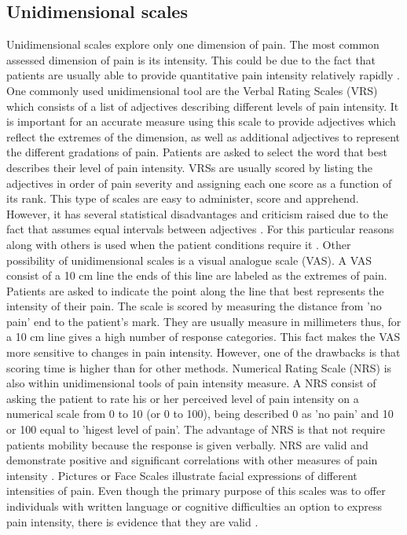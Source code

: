  \subsection{Unidimensional scales}
Unidimensional scales explore only one dimension of pain. The most common assessed dimension of pain is its intensity. This could be due to the fact that patients are usually able to provide quantitative pain intensity relatively rapidly \cite{libro pain}. One commonly used unidimensional tool are the Verbal Rating Scales (VRS) which consists of a list of adjectives describing different levels of pain intensity. It is important for an accurate measure using this scale to provide adjectives which reflect the extremes of the dimension, as well as additional adjectives to represent the different gradations of pain. Patients are asked to select the word that best describes their level of pain intensity. VRSs are usually scored by listing the adjectives in order of pain severity and assigning each one score as a function of its rank. This type of scales are easy to administer, score and apprehend. However, it has several statistical disadvantages and criticism raised due to the fact that assumes equal intervals between adjectives \cite{libro pain}. For this particular reasons along with others is used when the patient conditions require it \cite{six methods paper}. Other possibility of unidimensional scales is a visual analogue scale (VAS). A VAS consist of a 10 cm line the ends of this line are labeled as the extremes of pain. Patients are asked to indicate the point along the line that best represents the intensity of their pain. The scale is scored by measuring the distance from 'no pain' end to the patient's mark. They are usually measure in millimeters thus, for a 10 cm line gives a high number of response categories. This fact makes the VAS more sensitive to changes in pain intensity. However, one of the drawbacks is that scoring time is higher than for other methods. Numerical Rating Scale (NRS) is also within unidimensional tools of pain intensity measure. A NRS consist of asking the patient to rate his or her perceived level of pain intensity on a numerical scale from 0 to 10 (or 0 to 100), being described 0 as 'no pain' and  10 or 100 equal to 'higest level of pain'. The advantage of  NRS is that not require patients mobility because the response is given verbally. NRS are valid and demonstrate positive and significant correlations with other measures of pain intensity \cite{six methods paper}. Pictures or Face Scales illustrate facial expressions of different intensities of pain. Even though the primary purpose of this scales was to offer individuals with written language or cognitive difficulties an option to express pain intensity, there is evidence that they are valid \cite{libro pain}. 
